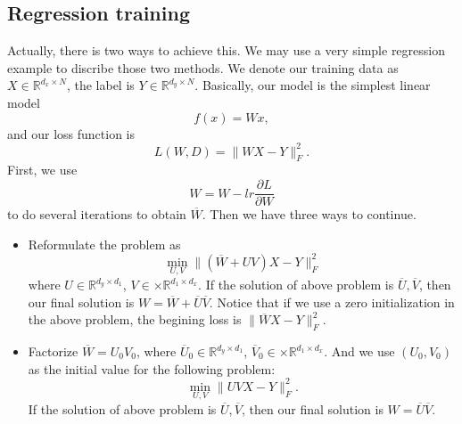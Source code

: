 \subsection{Regression training}
Actually, there is two ways to achieve this. We may use a very simple regression example to discribe those two methods. We denote our training data as $X\in \mathbb{R}^{d_x\times N}$, the label is $Y\in \mathbb{R}^{d_y\times N}$. Basically, our model is the simplest linear model
\begin{equation}
	f(x) = Wx,
\end{equation}
and our loss function is 
\begin{equation}
	L(W, D) = \|WX - Y\|_F^2.
\end{equation}
First, we use 
\begin{equation}
	W = W - lr \frac{\partial L}{\partial W}
\end{equation}
to do several iterations to obtain $\overline{W}$. Then we have three ways to continue.\\
\begin{itemize}
	\item Reformulate the problem as 
	\begin{equation}
	\min_{U,V} \|(\overline{W}+ UV)X - Y\|_F^2
	\end{equation}
	where $U\in \mathbb{R}^{d_y\times d_1}$, $V\in\times \mathbb{R}^{d_1\times d_x}$. If the solution of above problem is $\overline{U}, \overline{V}$, then our final solution is $W = \overline{W}+\overline{U}\overline{V}$. Notice that if we use a zero initialization in the above problem, the begining loss is $\|\overline{W} X - Y\|_F^2$.\\
	\item Factorize $\overline{W} = U_0 V_0$, where $\overline{U}_0\in \mathbb{R}^{d_y\times d_1}$, $\overline{V}_0\in\times \mathbb{R}^{d_1\times d_x}$. And we use $(U_0,V_0)$ as the initial value for the following problem:
	\begin{equation}
	\min_{U,V} \|UVX - Y\|_F^2.
	\end{equation}
	If the solution of above problem is $\overline{U}, \overline{V}$, then our final solution is $W = {\overline{U}}{\overline{V}}$.
\end{itemize}

